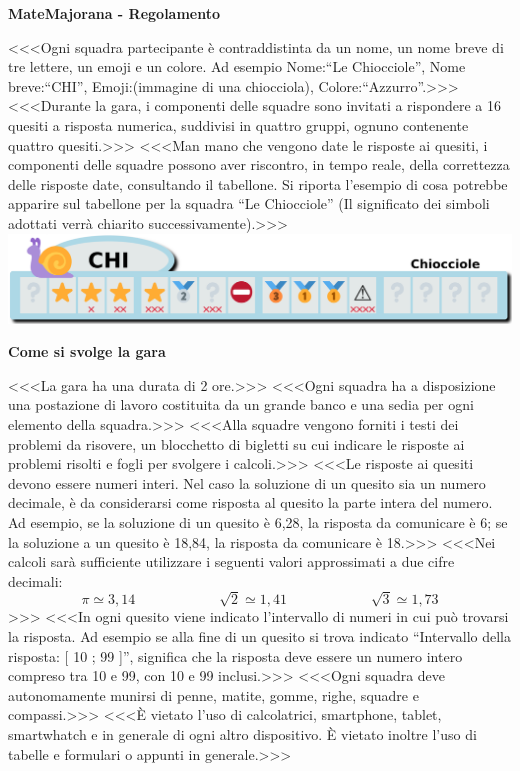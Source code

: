 \documentclass[12pt]{mcquiz}
\def\-#1{\qst <<<#1>>>}
\def\sec#1{\par{\bf\large#1}\par}
\def\tit#1{\par\begin{center}\bf\Large#1\end{center}\par}
\begin{document}
\tit{MateMajorana - Regolamento}
\-{Ogni squadra partecipante è contraddistinta da un nome, un nome breve di tre lettere, un emoji e un colore. Ad esempio Nome:``Le Chiocciole'', Nome breve:``CHI'', Emoji:(immagine di una chiocciola), Colore:``Azzurro''.}
\-{Durante la gara, i componenti delle squadre sono invitati a rispondere a 16 quesiti a risposta numerica, suddivisi in quattro gruppi, ognuno contenente quattro quesiti.}
\-{Man mano che vengono date le risposte ai quesiti, i componenti delle squadre possono aver riscontro, in tempo reale, della correttezza delle risposte date, consultando il tabellone. Si riporta l'esempio di cosa potrebbe apparire sul tabellone per la squadra ``Le Chiocciole'' (Il significato dei simboli adottati verrà chiarito successivamente).}
\includegraphics[width=\textwidth]{Esempio.png}
\sec{Come si svolge la gara}
\-{La gara ha una durata di 2 ore.}
\-{Ogni squadra ha a disposizione una postazione di lavoro costituita da un grande banco e una sedia per ogni elemento della squadra.}
\-{Alla squadre vengono forniti i testi dei problemi da risovere, un blocchetto di bigletti su cui indicare le risposte ai problemi risolti e fogli per svolgere i calcoli.}
\-{Le risposte ai quesiti devono essere numeri interi. Nel caso la soluzione di un quesito sia un numero decimale, è da considerarsi come risposta al quesito la parte intera del numero. Ad esempio, se la soluzione di un quesito è 6,28, la risposta da comunicare è 6; se la soluzione a un quesito è 18,84, la risposta da comunicare è 18.}
\-{Nei calcoli sarà sufficiente utilizzare i seguenti valori approssimati a due cifre decimali:\vspace{-.3cm}\\ $$\pi\simeq3,14\qquad\qquad\qquad\sqrt{2}\simeq1,41\qquad\qquad\qquad\sqrt{3}\simeq1,73$$}
\-{In ogni quesito viene indicato l'intervallo di numeri in cui può trovarsi la risposta. Ad esempio se alla fine di un quesito si trova indicato ``Intervallo della risposta: [ 10 ; 99 ]'', significa che la risposta deve essere un numero intero compreso tra 10 e 99, con 10 e 99 inclusi.}
\-{Ogni squadra deve autonomamente munirsi di penne, matite, gomme, righe, squadre e compassi.}
\-{\`E vietato l'uso di calcolatrici, smartphone, tablet, smartwhatch e in generale di ogni altro dispositivo. \`E vietato inoltre l'uso di tabelle e formulari o appunti in generale.}
\end{document}
